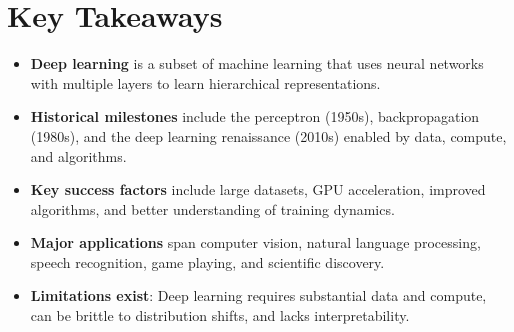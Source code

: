 
\section*{Key Takeaways}

\begin{keytakeaways}
\begin{itemize}[leftmargin=2em]
    \item \textbf{Deep learning} is a subset of machine learning that uses neural networks with multiple layers to learn hierarchical representations.
    \item \textbf{Historical milestones} include the perceptron (1950s), backpropagation (1980s), and the deep learning renaissance (2010s) enabled by data, compute, and algorithms.
    \item \textbf{Key success factors} include large datasets, GPU acceleration, improved algorithms, and better understanding of training dynamics.
    \item \textbf{Major applications} span computer vision, natural language processing, speech recognition, game playing, and scientific discovery.
    \item \textbf{Limitations exist}: Deep learning requires substantial data and compute, can be brittle to distribution shifts, and lacks interpretability.
\end{itemize}
\end{keytakeaways}



